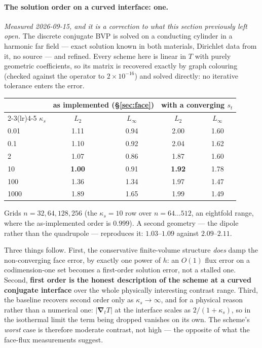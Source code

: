 \documentclass[11pt,a4paper]{article}
\newcommand{\grad}{\boldsymbol{\nabla}}
\begin{document}
\paragraph{The solution order on a curved interface: \textbf{one}.}
\emph{Measured 2026-09-15, and it is a correction to what this section
previously left open.} The discrete conjugate BVP is solved on a conducting
cylinder in a harmonic far field --- exact solution known in both materials,
Dirichlet data from it, no source --- and refined. Every scheme here is linear
in $T$ with purely geometric coefficients, so its matrix is recovered exactly
by graph colouring (checked against the operator to $2\times10^{-16}$) and
solved directly: no iterative tolerance enters the error.

\begin{center}
\begin{tabular}{lcccc}
\toprule
& \multicolumn{2}{c}{as implemented (\S\ref{sec:face})}
& \multicolumn{2}{c}{with a converging $s_t$} \\
\cmidrule(lr){2-3}\cmidrule(lr){4-5}
$\kappa_s$ & $L_2$ & $L_\infty$ & $L_2$ & $L_\infty$ \\
\midrule
0.01 & 1.11 & 0.94 & 2.00 & 1.60 \\
0.1  & 1.10 & 0.92 & 2.04 & 1.62 \\
2    & 1.07 & 0.86 & 1.87 & 1.60 \\
10   & \textbf{1.00} & 0.91 & \textbf{1.92} & 1.78 \\
100  & 1.36 & 1.34 & 1.97 & 1.47 \\
1000 & 1.89 & 1.65 & 1.99 & 1.49 \\
\bottomrule
\end{tabular}
\end{center}

\noindent
Grids $n=32,64,128,256$ (the $\kappa_s=10$ row over $n=64\ldots512$, an
eightfold range, where the as-implemented order is $0.999$). A second geometry
--- the dipole rather than the quadrupole --- reproduces it: $1.03$--$1.09$
against $2.09$--$2.11$.

Three things follow. First, the conservative finite-volume structure
\emph{does} damp the non-converging face error, by exactly one power of $h$:
an $O(1)$ flux error on a codimension-one set becomes a first-order solution
error, not a stalled one. Second, \textbf{first order is the honest
description of the scheme at a curved conjugate interface} over the whole
physically interesting contrast range. Third, the baseline recovers second
order only as $\kappa_s\to\infty$, and for a physical reason rather than a
numerical one: $|\grad_t T|$ at the interface scales as $2/(1+\kappa_s)$, so
in the isothermal limit the term being dropped vanishes on its own. The
scheme's \emph{worst} case is therefore moderate contrast, not high --- the
opposite of what the face-flux measurements suggest.
\end{document}
